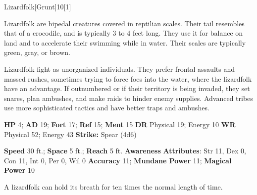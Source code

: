   \begin{monsection}{Lizardfolk}[Grunt]{10}[1]
    \vspace{-1em}\vspace{-1em}
    \vspace{0em}

    
    Lizardfolk are bipedal creatures covered in reptilian scales.
    Their tail resembles that of a crocodile, and is typically 3 to 4 feet long.
    They use it for balance on land and to accelerate their swimming while in water.
    Their scales are typically green, gray, or brown.

    Lizardfolk fight as unorganized individuals.
    They prefer frontal assaults and massed rushes, sometimes trying to force foes into the water, where the lizardfolk have an advantage.
    If outnumbered or if their territory is being invaded, they set snares, plan ambushes, and make raids to hinder enemy supplies.
    Advanced tribes use more sophisticated tactics and have better traps and ambushes.
  

    \begin{spellcontent}
      \begin{spelltargetinginfo}
        \pari \textbf{HP} 4;
          \textbf{AD} 19;
          \textbf{Fort} 17;
          \textbf{Ref} 15;
          \textbf{Ment} 15
        \pari \textbf{DR} Physical 19; Energy 10
        \pari \textbf{WR} Physical 52; Energy 43
        \pari \textbf{Strike:}
            Spear  (4d6)
      \end{spelltargetinginfo}
    \end{spellcontent}
    \begin{monsterfooter}
      \pari \textbf{Speed} 30 ft.;
        \textbf{Space} 5 ft.;
        \textbf{Reach} 5 ft.
      \pari \textbf{Awareness} 
      \pari \textbf{Attributes}:
        Str 11, Dex 0,
        Con 11, Int 0,
        Per 0, Wil 0
      \pari \textbf{Accuracy} 11;
        \textbf{Mundane Power} 11;
      \textbf{Magical Power} 10
    \end{monsterfooter}
  \end{monsection}
   A lizardfolk can hold its breath for ten times the normal length of time.
  
